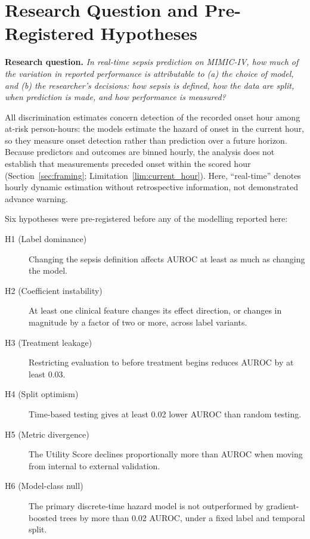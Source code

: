 \section{Research Question and Pre-Registered Hypotheses}
\label{sec:rq}

\noindent\textbf{Research question.} \textit{In real-time sepsis prediction on
MIMIC-IV, how much of the variation in reported performance is attributable to
(a) the choice of model, and (b) the researcher's decisions: how sepsis is
defined, how the data are split, when prediction is made, and how performance
is measured?}

All discrimination estimates concern detection of the recorded onset hour
among at-risk person-hours: the models estimate the hazard of onset in the
current hour, so they measure onset detection rather than prediction over a
future horizon. Because predictors and outcomes are binned hourly, the analysis
does not establish that measurements preceded onset within the scored hour
(Section~\ref{sec:framing}; Limitation~\ref{lim:current_hour}). Here,
``real-time'' denotes hourly dynamic estimation without retrospective
information, not demonstrated advance warning.

Six hypotheses were pre-registered before any of the modelling reported here:

\begin{description}
    \item[H1 (Label dominance)] Changing the sepsis definition affects AUROC at
    least as much as changing the model.
    \item[H2 (Coefficient instability)] At least one clinical feature changes its
    effect direction, or changes in magnitude by a factor of two or more, across
    label variants.
    \item[H3 (Treatment leakage)] Restricting evaluation to before treatment
    begins reduces AUROC by at least 0.03.
    \item[H4 (Split optimism)] Time-based testing gives at least 0.02 lower AUROC
    than random testing.
    \item[H5 (Metric divergence)] The Utility Score declines proportionally more
    than AUROC when moving from internal to external validation.
    \item[H6 (Model-class null)] The primary discrete-time hazard model is not
    outperformed by gradient-boosted trees by more than 0.02 AUROC, under a
    fixed label and temporal split.
\end{description}


